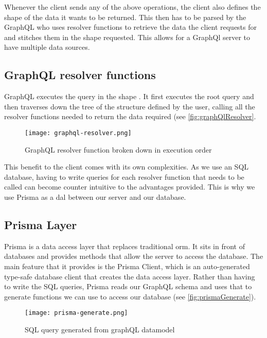 Whenever the client sends any of the above operations, the client also defines the shape of the data it wants to be returned. This then has to be parsed by the GraphQL who uses resolver functions to retrieve the data the client requests for and stitches them in the shape requested. This allows for a GraphQl server to have multiple data sources.

\subsection{GraphQL resolver functions}
GraphQL executes the query in the shape \cite{jonas2016graphql}. It first executes the root query and then traverses down the tree of the structure defined by the user, calling all the resolver functions needed to return the data required (see \autoref{fig:graphQlResolver}.


\begin{figure}[htb!]
    \centering
    \texttt{[image: graphql-resolver.png]}
    \caption{GraphQL resolver function broken down in execution order \cite{jonas2016graphql}}
    \label{fig:graphQlResolver}
\end{figure}

This benefit to the client comes with its own complexities. As we use an SQL database, having to write queries for each resolver function that needs to be called can become counter intuitive to the advantages provided. This is why we use Prisma as a \acrfull{dal} between our server and our database.

\subsection{Prisma Layer}
Prisma \cite{prisma} is a data access layer that replaces traditional \acrfull{orm}. It sits in front of databases and provides methods that allow the server to access the database. The main feature that it provides is the Prisma Client, which is an auto-generated type-safe database client that creates the data access layer. Rather than having to write the SQL queries, Prisma reads our GraphQL schema and uses that to generate functions we can use to access our database (see \autoref{fig:prismaGenerate}).

\begin{figure}[htb!]
    \centering
    \texttt{[image: prisma-generate.png]}
    \caption{SQL query generated from graphQL datamodel \cite{prismageneratesql}}
    \label{fig:prismaGenerate}
\end{figure}


